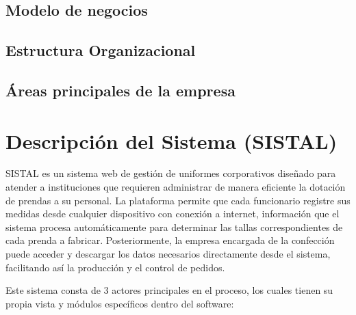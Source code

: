 \subsection{Modelo de negocios}

\subsection{Estructura Organizacional}

\subsection{Áreas principales de la empresa}

\section{Descripción del Sistema (SISTAL)}

SISTAL es un sistema web de gestión de uniformes corporativos diseñado para atender a instituciones que requieren administrar de manera eficiente la dotación de prendas a su personal. La plataforma permite que cada funcionario registre sus medidas desde cualquier dispositivo con conexión a internet, información que el sistema procesa automáticamente para determinar las tallas correspondientes de cada prenda a fabricar. Posteriormente, la empresa encargada de la confección puede acceder y descargar los datos necesarios directamente desde el sistema, facilitando así la producción y el control de pedidos.

Este sistema consta de 3 actores principales en el proceso, los cuales tienen su propia vista y módulos específicos dentro del software:

